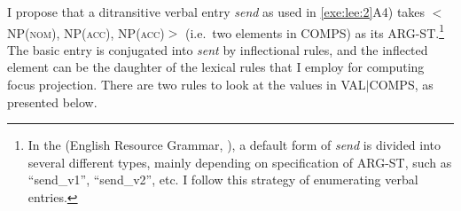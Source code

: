 \largerpage[2]
I propose that a ditransitive verbal entry \textit{send} as used in
\ref{exe:lee:2}A4) takes \ensuremath{<}NP(\textsc{nom}), NP(\textsc{acc}), NP(\textsc{acc})\ensuremath{>}
(i.e.\ two elements in COMPS) as its ARG-ST.\footnote{In the 
  (English Resource Grammar, \citealt{flickinger:00}), a default form
  of \textit{send} is divided into several different types, mainly
  depending on specification of ARG-ST, such as ``send\_v1'',
  ``send\_v2'', etc.  I follow this strategy of enumerating verbal
  entries.}  The basic entry is conjugated into \textit{sent} by
inflectional rules, and the inflected element can be the daughter of
the lexical rules that I employ for computing focus projection. There
are two rules to look at the values in VAL{$\mid$}COMPS, as presented
below.





